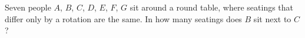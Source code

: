 Seven people $A$, $B$, $C$, $D$, $E$, $F$, $G$ sit around a round table, where seatings that differ only by a rotation are the same. In how many seatings does $B$ sit next to $C$?
